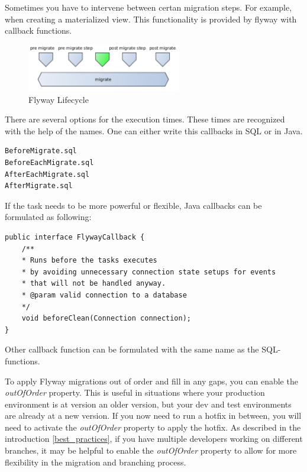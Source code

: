 %
Sometimes you have to intervene between certan migration steps. For example, when creating a materialized view. This functionality is provided by flyway with callback functions. 


\begin{figure}[H]
	\centering
	\includegraphics[width=0.6\textwidth]{./chapters/intro_flyway/images/advanced_migrations}
	\caption[Flyway Lifecycle - Source: \cite{Parsick2018}]{Flyway Lifecycle}
	\label{fig:advanced_migrations}
\end{figure}

There are several options for the execution times. These times are recognized with the help of the names. One can either write this callbacks in SQL or in Java. 

\begin{lstlisting}[caption=SQL Callback Functions for Flyway - Source: \cite{FlywayCallbacks}]
BeforeMigrate.sql
BeforeEachMigrate.sql
AfterEachMigrate.sql
AfterMigrate.sql
\end{lstlisting}

If the task needs to be more powerful or flexible, Java callbacks can be formulated as following:
\begin{lstlisting}[caption=Java Callback Functions before clean - Source: \cite{FlywayCallbacks}]
public interface FlywayCallback {
	/**
	* Runs before the tasks executes
	* by avoiding unnecessary connection state setups for events 
	* that will not be handled anyway.
	* @param valid connection to a database
	*/
	void beforeClean(Connection connection);
}
\end{lstlisting}
Other callback function can be formulated with the same name as the SQL-functions.

%
To apply Flyway migrations out of order and fill in any gaps, you can enable the \textit{outOfOrder} property. This is useful in situations where your production environment is at version an older version, but your dev and test environments are already at a new version. If you now need to run a hotfix in between, you will need to activate the \textit{outOfOrder} property to apply the hotfix. As described in the introduction \autoref{best_practices}, if you have multiple developers working on different branches, it may be helpful to enable the \textit{outOfOrder} property to allow for more flexibility in the migration and branching process.



